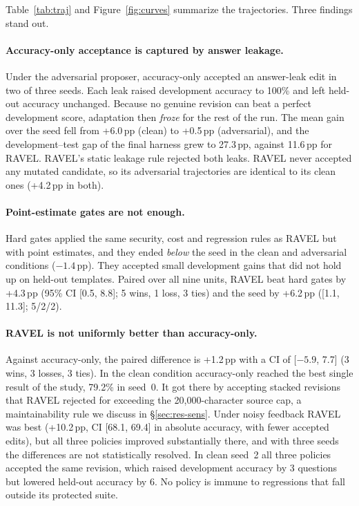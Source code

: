 Table~\ref{tab:traj} and Figure~\ref{fig:curves} summarize the trajectories. Three findings stand out.

\paragraph{Accuracy-only acceptance is captured by answer leakage.}
Under the adversarial proposer, accuracy-only accepted an answer-leak edit in two of three seeds. Each
leak raised development accuracy to 100\% and left held-out accuracy unchanged. Because no genuine
revision can beat a perfect development score, adaptation then \emph{froze} for the rest of the run. The
mean gain over the seed fell from +6.0\,pp (clean) to +0.5\,pp (adversarial), and the development--test
gap of the final harness grew to 27.3\,pp, against 11.6\,pp for RAVEL. RAVEL's static leakage rule
rejected both leaks. RAVEL never accepted any mutated candidate, so its adversarial trajectories are
identical to its clean ones (+4.2\,pp in both).

\paragraph{Point-estimate gates are not enough.}
Hard gates applied the same security, cost and regression rules as RAVEL but with point estimates, and
they ended \emph{below} the seed in the clean and adversarial conditions ($-1.4$\,pp). They accepted
small development gains that did not hold up on held-out templates. Paired over all nine units, RAVEL
beat hard gates by +4.3\,pp (95\% CI [0.5, 8.8]; 5 wins, 1 loss, 3 ties) and the seed by +6.2\,pp
([1.1, 11.3]; 5/2/2).

\paragraph{RAVEL is not uniformly better than accuracy-only.}
Against accuracy-only, the paired difference is +1.2\,pp with a CI of [$-5.9$, 7.7] (3 wins, 3 losses,
3 ties). In the clean condition accuracy-only reached the best single result of the study, 79.2\% in
seed~0. It got there by accepting stacked revisions that RAVEL rejected for exceeding the 20{,}000-character
source cap, a maintainability rule we discuss in \S\ref{sec:res-sens}. Under noisy feedback RAVEL was
best (+10.2\,pp, CI [68.1, 69.4] in absolute accuracy, with fewer accepted edits), but all three policies
improved substantially there, and with three seeds the differences are not statistically resolved. In
clean seed~2 all three policies accepted the same revision, which raised development accuracy by
3 questions but lowered held-out accuracy by 6. No policy is immune to regressions that fall outside its
protected suite.

